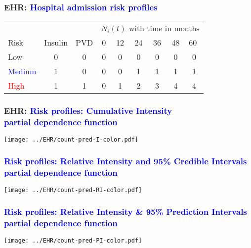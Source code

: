 \documentclass[11pt,pdftex,dvipsnames,usenames,helvetica]{beamer}
\begin{document}
\begin{frame}\frametitle{EHR: \textcolor{blue}{Hospital admission risk profiles}}
\begin{center}
\begin{tabular}{l|cc|cccccc} \hline
& & & \multicolumn{6}{|l}{$N_i(t)$ with time in months} \\
Risk & Insulin & PVD & 0 &12 &24 &36 &48 & \multicolumn{1}{l}{60} \\ \hline
Low     & 0 & 0  & 0 & 0 & 0 & 0 & 0 & 0  \\
\textcolor{blue}{Medium}  & 1 & 0  & 0 & 0 & 1 & 1 & 1 & 1  \\
\textcolor{red}{High}    & 1 & 1  & 0 & 1 & 2 & 3 & 4 & 4  \\ \hline
\end{tabular}
\end{center}
\end{frame}

\begin{frame}\frametitle{EHR: \textcolor{blue}{Risk profiles: Cumulative Intensity\\partial dependence function}}
\begin{center}
\texttt{[image: ../EHR/count-pred-I-color.pdf]}
\end{center}
\end{frame}

\begin{frame}\frametitle{\textcolor{blue}{Risk profiles: Relative Intensity and 95\% Credible Intervals\\partial dependence function}}
\begin{center}
\texttt{[image: ../EHR/count-pred-RI-color.pdf]}
\end{center}
\end{frame}

\begin{frame}\frametitle{\textcolor{blue}{Risk profiles: Relative Intensity \& 95\% Prediction Intervals\\partial dependence function}}
\begin{center}
\texttt{[image: ../EHR/count-pred-PI-color.pdf]}
\end{center}
\end{frame}
\end{document}
